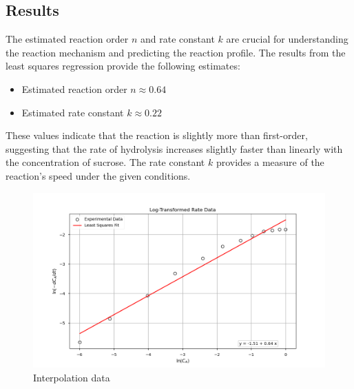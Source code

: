 \documentclass[10pt]{article}
\begin{document}
\subsection{Results}

The estimated reaction order \( n \) and rate constant \( k \) are crucial for understanding the reaction mechanism and predicting the reaction profile. The results from the least squares regression provide the following estimates:
\begin{itemize}
    \item Estimated reaction order \( n \approx 0.64 \)
    \item Estimated rate constant \( k \approx 0.22 \)
\end{itemize}

These values indicate that the reaction is slightly more than first-order, suggesting that the rate of hydrolysis increases slightly faster than linearly with the concentration of sucrose. The rate constant \( k \) provides a measure of the reaction's speed under the given conditions.

\begin{figure}[H]
    \centering
    \includegraphics[width=\imagewidth\textwidth]{figures/09_ODE/log_transformed_rate_data.png}
    \caption{Interpolation data}
\end{figure}
\end{document}
